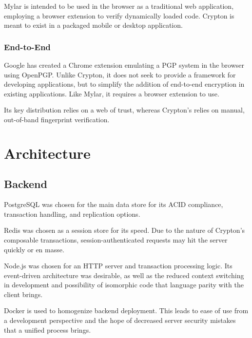 \documentclass[conference]{IEEEtran}
\begin{document}
Mylar is intended to be used in the browser as a traditional web application,
employing a browser extension to verify dynamically loaded code. Crypton is meant
to exist in a packaged mobile or desktop application.

\subsubsection{End-to-End}
Google has created a Chrome extension\cite{endtoendblog} emulating a
PGP system in the browser using OpenPGP\cite{endtoend}. Unlike Crypton,
it does not seek to provide a framework for developing applications,
but to simplify the addition of end-to-end encryption in existing applications.
Like Mylar, it requires a browser extension to use.

Its key distribution relies on a web of trust\cite{endtoendkeydistribution},
whereas Crypton's relies on manual, out-of-band fingerprint verification.

\section{Architecture}

\subsection{Backend}
PostgreSQL was chosen for the main data store for its ACID compliance,
transaction handling, and replication options.

Redis was chosen as a session store for its speed.
Due to the nature of Crypton's composable transactions,
session-authenticated requests may hit the server quickly or en masse.

Node.js was chosen for an HTTP server and transaction processing logic.
Its event-driven architecture was desirable, as well as the reduced
context switching in development and possibility of isomorphic code
that language parity with the client brings.

Docker is used to homogenize backend deployment. This leads to ease of
use from a development perspective and the hope of decreased server
security mistakes that a unified process brings.

\end{document}

